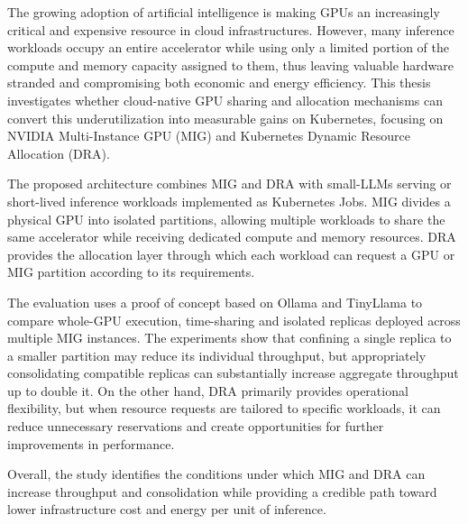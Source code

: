 The growing adoption of artificial intelligence is making GPUs an increasingly critical and expensive resource in cloud infrastructures. However, many inference workloads occupy an entire accelerator while using only a limited portion of the compute and memory capacity assigned to them, thus leaving valuable hardware stranded and compromising both economic and energy efficiency.
This thesis investigates whether cloud-native GPU sharing and allocation mechanisms can convert this underutilization into measurable gains on Kubernetes, focusing on NVIDIA Multi-Instance GPU (MIG) and Kubernetes Dynamic Resource Allocation (DRA).

The proposed architecture combines MIG and DRA with small-LLMs serving or short-lived inference workloads implemented as Kubernetes Jobs. MIG divides a physical GPU into isolated partitions, allowing multiple workloads to share the same accelerator while receiving dedicated compute and memory resources. DRA provides the allocation layer through which each workload can request a GPU or MIG partition according to its requirements.

The evaluation uses a proof of concept based on Ollama and TinyLlama to compare whole-GPU execution, time-sharing and isolated replicas deployed across multiple MIG instances. The experiments show that confining a single replica to a smaller partition may reduce its individual throughput, but appropriately consolidating compatible replicas can substantially increase aggregate throughput up to double it. On the other hand, DRA primarily provides operational flexibility, but when resource requests are tailored to specific workloads, it can reduce unnecessary reservations and create opportunities for further improvements in performance.

Overall, the study identifies the conditions under which MIG and DRA can increase throughput and consolidation while providing a credible path toward lower infrastructure cost and energy per unit of inference.